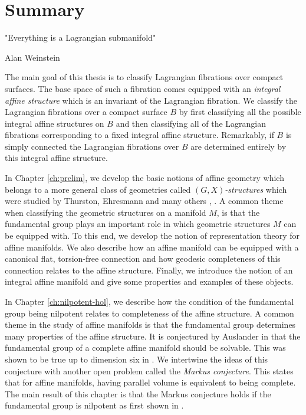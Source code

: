 \chapter*{Summary}
\label{ch:summary}

\vspace*{-1cm}
\epigraph{"Everything is a Lagrangian submanifold"}{Alan Weinstein}

The main goal of this thesis is to classify Lagrangian fibrations over compact
surfaces. The base space of such a fibration comes equipped with an
\emph{integral affine structure} which is an invariant of the Lagrangian
fibration. We classify the Lagrangian fibrations over a compact surface $B$ by
first classifying all the possible integral affine structures on $B$ and then
classifying all of the Lagrangian fibrations corresponding to a fixed integral
affine structure. Remarkably, if $B$ is simply connected the Lagrangian
fibrations over $B$ are determined entirely by this integral affine structure.

In Chapter \ref{ch:prelim}, we develop the basic notions of affine geometry
which belongs to a more general class of geometries called
$(G,X)$\emph{-structures} which were studied by Thurston, Ehresmann and many
others \cite{thurston1980geometry}, \cite{Ehresmann1936}. A common theme when
classifying the geometric structures on a manifold $M$, is that the fundamental
group plays an important role in which geometric structures $M$ can be equipped
with. To this end, we develop the notion of representation theory for affine
manifolds. We also describe how an affine manifold can be equipped with a
canonical flat, torsion-free connection and how geodesic completeness of this
connection relates to the affine structure. Finally, we introduce the notion of
an integral affine manifold and give some properties and examples of these
objects.

In Chapter \ref{ch:nilpotent-hol}, we describe how the condition of the
fundamental group being nilpotent relates to completeness of the affine
structure. A common theme in the study of affine manifolds is that the
fundamental group determines many properties of the affine structure. It is
conjectured by Auslander in \cite{AUSLANDER1964131} that the fundamental group
of a complete affine manifold should be solvable. This was shown to be true up
to dimension six in \cite{abels2020auslanderconjecturedimension7}. We
intertwine the ideas of this conjecture with another open problem called the
\emph{Markus conjecture}. This states that for affine manifolds, having
parallel volume is equivalent to being complete. The main result of this
chapter is that the Markus conjecture holds if the fundamental group is
nilpotent as first shown in \cite{nilpotent-holonomy}.

